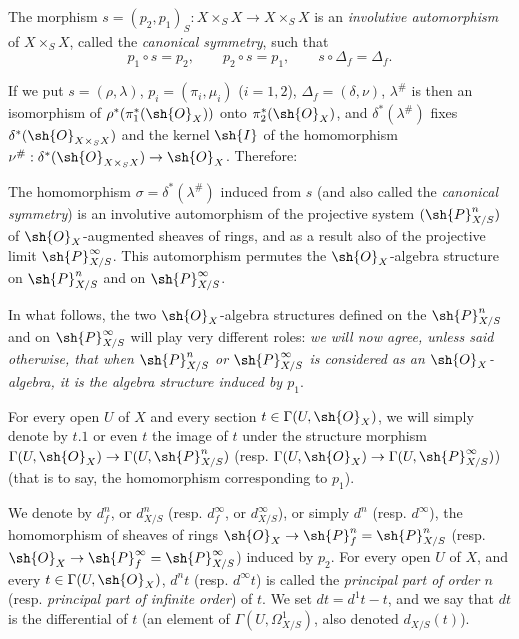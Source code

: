\begin{env}[16.3.3]
\label{IV.16.3.3}
The morphism $s = (p_2, p_1)_S: X \times_S X \to X \times_S X$ is an \emph{involutive automorphism} of $X \times_S X$, called the \emph{canonical symmetry}, such that
\[
  \label{IV.16.3.3.1}
  p_1 \circ s = p_2, \qquad p_2 \circ s = p_1, \qquad s \circ \Delta_f = \Delta_f.
  \tag{16.3.3.1}
\]

If we put $s = (\rho, \lambda)$, $p_i = (\pi_i, \mu_i)$ ($i = 1,2$), $\Delta_f = (\delta, \nu)$, $\lambda^\#$ is then an isomorphism of $\rho^*(\pi_1^*(\sh{O}_X))$ onto $\pi_2^*(\sh{O}_X)$, and $\delta^*(\lambda^\#)$ fixes $\delta^*(\sh{O}_{X \times_S X})$ and the kernel $\sh{I}$ of the homomorphism $\nu^\#: \delta^*(\sh{O}_{X \times_S X}) \to \sh{O}_X$.
Therefore:
\end{env}

\begin{proposition}[16.3.4]
\label{IV.16.3.4}
The homomorphism $\sigma = \delta^*(\lambda^\#)$ induced from $s$ (and also called the \emph{canonical symmetry}) is an involutive automorphism of the projective system $(\sh{P}_{X/S}^n)$ of $\sh{O}_X$-augmented 
sheaves of rings, and as a result also of the projective limit $\sh{P}_{X/S}^\infty$.
This automorphism permutes the $\sh{O}_X$-algebra structure on $\sh{P}_{X/S}^n$ and on $\sh{P}_{X/S}^\infty$.
\end{proposition}

\begin{env}[16.3.5]
\label{IV.16.3.5}
In what follows, the two $\sh{O}_X$-algebra structures defined on the $\sh{P}_{X/S}^n$ and on $\sh{P}_{X/S}^\infty$ will play very different roles:
\emph{we will now agree, unless said otherwise, that when $\sh{P}_{X/S}^n$ or $\sh{P}_{X/S}^\infty$ is considered as an $\sh{O}_X$-algebra, it is the algebra structure induced by $p_1$}.
\end{env}

For every open $U$ of $X$ and every section $t \in \Gamma(U, \sh{O}_X)$, we will simply denote by $t.1$ or even $t$ the image of $t$ under the structure morphism $\Gamma(U, \sh{O}_X) \to \Gamma(U, \sh{P}_{X/S}^n)$ (resp. $\Gamma(U, \sh{O}_X) \to \Gamma(U, \sh{P}_{X/S}^\infty)$) (that is to say, the homomorphism corresponding to $p_1$).

\begin{definition}[16.3.6]
\label{IV.16.3.6}
We denote by $d_f^n$, or $d_{X/S}^n$ (resp. $d_f^\infty$, or $d_{X/S}^\infty$), or simply $d^n$ (resp. $d^\infty$), the homomorphism of sheaves of rings $\sh{O}_X \to \sh{P}_{f}^n = \sh{P}_{X/S}^n$ (resp. $\sh{O}_X \to \sh{P}_{f}^\infty = \sh{P}_{X/S}^\infty$) induced by $p_2$.
For every open $U$ of $X$, and every $t \in \Gamma(U, \sh{O}_X)$, $d^n t$ (resp. $d^\infty t$) is called the \emph{principal part of order $n$} (resp. \emph{principal part of infinite order}) of $t$.
We set $dt = d^1 t - t$, and we say that $dt$ is the differential of $t$ (an element of $\Gamma(U, \Omega_{X/S}^1)$, also denoted $d_{X/S}(t)$).
\end{definition}  

